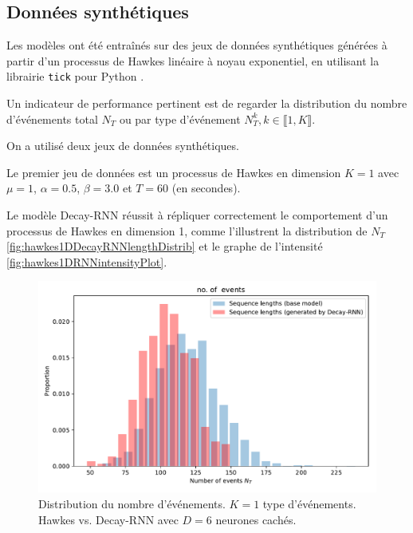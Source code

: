 \documentclass[../main.tex]{subfiles}
\begin{document}
\subsection{Données synthétiques}\label{ssec:synthResults}

Les modèles ont été entraînés sur des jeux de données synthétiques générées à partir d'un processus de Hawkes linéaire à noyau exponentiel, en utilisant la librairie \verb|tick| pour Python \cite{2017arXiv170703003B}.

Un indicateur de performance pertinent est de regarder la distribution du nombre d'événements total $N_T$ ou par type d'événement $N^k_T, k\in\llbracket 1,K\rrbracket$.

On a utilisé deux jeux de données synthétiques.

Le premier jeu de données est un processus de Hawkes en dimension $K=1$ avec $\mu=1$, $\alpha = 0.5$, $\beta = 3.0$ et $T = 60$ (en secondes).

Le modèle Decay-RNN réussit à répliquer correctement le comportement d'un processus de Hawkes en dimension 1, comme l'illustrent la distribution de $N_T$ \autoref{fig:hawkes1DDecayRNNlengthDistrib} et le graphe de l'intensité \autoref{fig:hawkes1DRNNintensityPlot}.

\begin{figure}[htp]
	\includegraphics[width=\linewidth]{../results/seq_length_distrib_Decay-RNN-1d-hidden_6-20181201-220235.pdf}
	\caption{Distribution du nombre d'événements. $K=1$ type d'événements. Hawkes vs. Decay-RNN avec $D=6$ neurones cachés.}\label{fig:hawkes1DDecayRNNlengthDistrib}
\end{figure}
\end{document}
